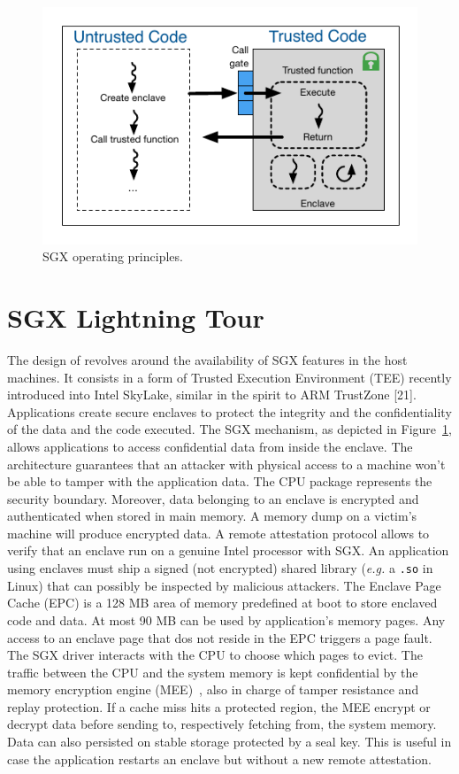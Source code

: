 \begin{figure}[!t]
  \centering
  \includegraphics[scale=0.8]{images/sgx.pdf}
  \caption{SGX operating principles.}
  \label{fig:sgx}
\end{figure}

\section{SGX Lightning Tour}
\label{sec:background}
The design of \SYS revolves around the availability of SGX features in the host machines. 
It consists in a form of Trusted Execution Environment (TEE) recently introduced into Intel SkyLake, similar in the spirit to ARM TrustZone [21]. 
Applications create secure enclaves to protect the integrity and the confidentiality of the data and the code executed. 
The SGX mechanism, as depicted in Figure~\ref{fig:sgx}, allows applications to access confidential data from inside the enclave. 
The architecture guarantees that an attacker with physical access to a machine won’t be able to tamper with the application data. 
The CPU package represents the security boundary. 
Moreover, data belonging to an enclave is encrypted and authenticated when stored in main memory. 
A memory dump on a victim’s machine will produce encrypted data. 
A remote attestation protocol allows to verify that an enclave run on a genuine Intel processor with SGX. 
An application using enclaves must ship a signed (not encrypted) shared library (\emph{e.g.} a \texttt{.so} in Linux) that can possibly be inspected by malicious attackers. 
The Enclave Page Cache (EPC) is a 128 MB area of memory predefined at boot to store enclaved code and data. 
At most 90 MB can be used by application’s memory pages. 
Any access to an enclave page that dos not reside in the EPC triggers a page fault. 
The SGX driver interacts with the CPU to choose which pages to evict. 
The traffic between the CPU and the system memory is kept confidential by the memory encryption engine (MEE)~\cite{gueron2016memory}, also in charge of tamper resistance and replay protection. 
If a cache miss hits a protected region, the MEE encrypt or decrypt data before sending to, respectively fetching from, the system memory. 
Data can also persisted on stable storage protected by a seal key. 
This is useful in case the application restarts an enclave but without a new remote attestation.